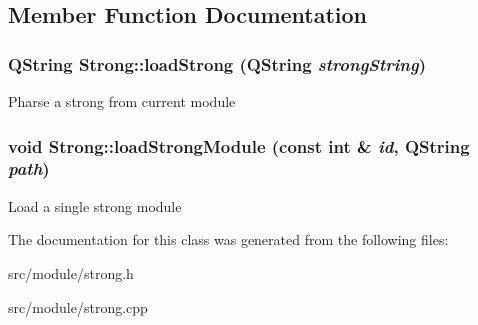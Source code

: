 \subsection{Member Function Documentation}
\hypertarget{classStrong_a959af8bb7edc87e78c04f73837094724}{
\subsubsection[{loadStrong}]{\setlength{\rightskip}{0pt plus 5cm}QString Strong::loadStrong (QString {\em strongString})}}
\label{classStrong_a959af8bb7edc87e78c04f73837094724}
Pharse a strong from current module \hypertarget{classStrong_ac29b6ad75969dd5ef690a82c15e18fe1}{
\subsubsection[{loadStrongModule}]{\setlength{\rightskip}{0pt plus 5cm}void Strong::loadStrongModule (const int \& {\em id}, \/  QString {\em path})}}
\label{classStrong_ac29b6ad75969dd5ef690a82c15e18fe1}
Load a single strong module 

The documentation for this class was generated from the following files:\begin{DoxyCompactItemize}
\item 
src/module/strong.h\item 
src/module/strong.cpp\end{DoxyCompactItemize}
